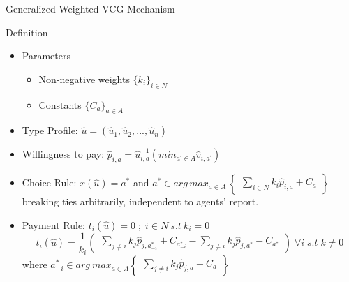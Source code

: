 \begin{frame}{Generalized Weighted VCG Mechanism}
\begin{block}{Definition}
\begin{itemize}
    \item Parameters
    \begin{itemize}
        \item Non-negative weights $\{k_{i}\}_{i \in N}$
        \item Constants $\{C_{a}\}_{a \in A}$
    \end{itemize}
    \item Type Profile: $\hat{u} = (\hat{u}_{1},\hat{u}_{2},...,\hat{u}_{n})$
    \item Willingness to pay: $\hat{p}_{i,a} = \hat{u}_{i,a}^{-1}(min_{a^{'}\in A}\hat{v}_{i,a^{'}})$
    \item Choice Rule: $x(\hat{u})=a^{*}$ and
    $a^{*} \in arg\, max_{a \in A}\, \begin{Bmatrix}
\sum _{i \in N}k_{i}\hat{p}_{i,a}+C_{a}
\end{Bmatrix}$
breaking ties arbitrarily, independent to agents' report.
\item Payment Rule: $t_{i}(\hat{u}) = 0 \; ; \; i \in N\: s.t\: k_{i}=0 $
$$t_{i}(\hat{u}) = \frac{1}{k_{i}}\begin{pmatrix}
\sum _{j \neq i}k_{j}\hat{p}_{j,a_{-i}^{*}} + C_{a_{-i}^{*}} - \sum _{j \neq i}k_{j}\hat{p}_{j,a^{*}} - C_{a^{*}}
\end{pmatrix} \; \forall i\; s.t \; k \neq 0$$
where $a_{-i}^{*} \in arg\: max_{a\in A}\begin{Bmatrix}
\sum _{j \neq i}k_{j}\hat{p}_{j,a} + C_{a}
\end{Bmatrix}$
\end{itemize}
\end{block}
\end{frame}
